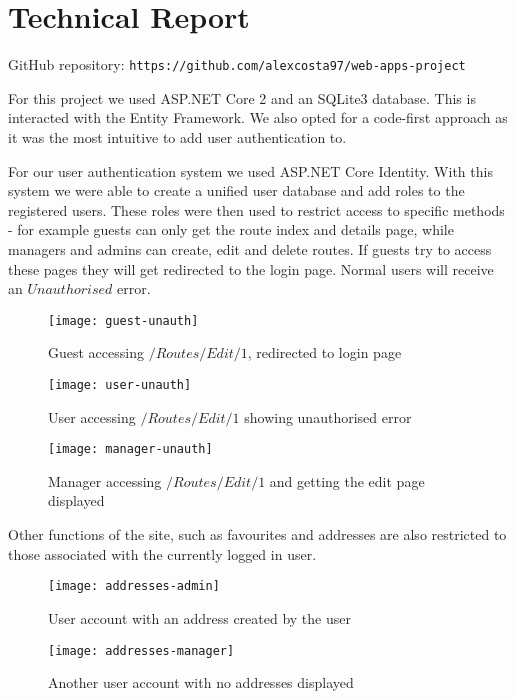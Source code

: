\chapter{Technical Report}

GitHub repository: \texttt{https://github.com/alexcosta97/web-apps-project}

For this project we used ASP.NET Core 2 and an SQLite3 database. This is
interacted with the Entity Framework. We also opted for a code-first approach as
 it was the most intuitive to add user authentication to.

For our user authentication system we used ASP.NET Core Identity. With this
system we were able to create a unified user database and add roles to the
registered users. These roles were then used to restrict access to specific
methods - for example guests can only get the route index and details page,
while managers and admins can create, edit and delete routes. If guests try to
access these pages they will get redirected to the login page. Normal users will
receive an $Unauthorised$ error.

\begin{figure}[ht]
  \centering
  \texttt{[image: guest-unauth]}
  \caption{Guest accessing $/Routes/Edit/1$, redirected to login page}
\end{figure}

\begin{figure}[ht]
  \centering
  \texttt{[image: user-unauth]}
  \caption{User accessing $/Routes/Edit/1$ showing unauthorised error}
\end{figure}

\begin{figure}[ht]
  \centering
  \texttt{[image: manager-unauth]}
  \caption{Manager accessing $/Routes/Edit/1$ and getting the edit page displayed}
\end{figure}

\clearpage
Other functions of the site, such as favourites and addresses are also restricted
to those associated with the currently logged in user.

\begin{figure}[ht]
  \centering
  \texttt{[image: addresses-admin]}
  \caption{User account with an address created by the user}
\end{figure}

\begin{figure}[ht]
  \centering
  \texttt{[image: addresses-manager]}
  \caption{Another user account with no addresses displayed}
\end{figure}
